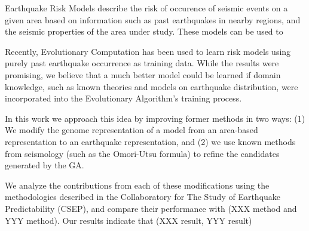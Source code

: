 Earthquake Risk Models describe the risk of occurence of seismic
events on a given area based on information such as past earthquakes
in nearby regions, and the seismic properties of the area under study. 
These models can be used to 


Recently, Evolutionary Computation has been used to learn risk models
using purely past earthquake occurrence as training data. While the
results were promising, we believe that a much better model could be
learned if domain knowledge, such as known theories and models on
earthquake distribution, were incorporated into the Evolutionary
Algorithm's training process.

In this work we approach this idea by improving former methods in two
ways: (1) We modify the genome representation of a model from an
area-based representation to an earthquake representation, and (2) we
use known methods from seismology (such as the Omori-Utsu formula) to 
refine the candidates generated by the GA.

We analyze the contributions from each of these modifications using
the methodologies described in the Collaboratory for The Study of
Earthquake Predictability (CSEP), and compare their performance with
(XXX method and YYY method). Our results indicate that (XXX result,
YYY result)
